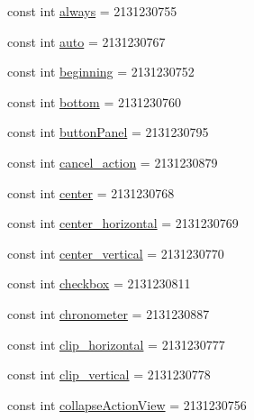 \begin{DoxyCompactItemize}
const int \mbox{\hyperlink{class_f_w_p_s___app_1_1_droid_1_1_resource_1_1_id_a29f3c29a08621a6d1b99e1af41df2c50}{always}} = 2131230755
\item 
const int \mbox{\hyperlink{class_f_w_p_s___app_1_1_droid_1_1_resource_1_1_id_afa5149667d34859ac0b674d23b6a4b42}{auto}} = 2131230767
\item 
const int \mbox{\hyperlink{class_f_w_p_s___app_1_1_droid_1_1_resource_1_1_id_af2a36e42b6848ba0f5e3dc34737400c0}{beginning}} = 2131230752
\item 
const int \mbox{\hyperlink{class_f_w_p_s___app_1_1_droid_1_1_resource_1_1_id_ac53080974016f8a3835da246a13082bf}{bottom}} = 2131230760
\item 
const int \mbox{\hyperlink{class_f_w_p_s___app_1_1_droid_1_1_resource_1_1_id_a85cd3b055d0c573fd415f6b214b64ece}{button\+Panel}} = 2131230795
\item 
const int \mbox{\hyperlink{class_f_w_p_s___app_1_1_droid_1_1_resource_1_1_id_a7eb823e9f122f33fdab97caff07fc582}{cancel\+\_\+action}} = 2131230879
\item 
const int \mbox{\hyperlink{class_f_w_p_s___app_1_1_droid_1_1_resource_1_1_id_aaf9cd2fe67ad08c125ee8c3cbc5a6b6e}{center}} = 2131230768
\item 
const int \mbox{\hyperlink{class_f_w_p_s___app_1_1_droid_1_1_resource_1_1_id_ad3311bea79e59d4c516152dfc2dbf69a}{center\+\_\+horizontal}} = 2131230769
\item 
const int \mbox{\hyperlink{class_f_w_p_s___app_1_1_droid_1_1_resource_1_1_id_afd8c138a3275e3042e3a9345886d9435}{center\+\_\+vertical}} = 2131230770
\item 
const int \mbox{\hyperlink{class_f_w_p_s___app_1_1_droid_1_1_resource_1_1_id_a2f25004902cfe6883a1cf2e8206ae831}{checkbox}} = 2131230811
\item 
const int \mbox{\hyperlink{class_f_w_p_s___app_1_1_droid_1_1_resource_1_1_id_a26e6fc6e09fbfb4c8dbdeef2c6e54d70}{chronometer}} = 2131230887
\item 
const int \mbox{\hyperlink{class_f_w_p_s___app_1_1_droid_1_1_resource_1_1_id_a84c2697d7811edc69dcad3144a96dcde}{clip\+\_\+horizontal}} = 2131230777
\item 
const int \mbox{\hyperlink{class_f_w_p_s___app_1_1_droid_1_1_resource_1_1_id_ad7cd7da315f5ae850ddf9382cee6886a}{clip\+\_\+vertical}} = 2131230778
\item 
const int \mbox{\hyperlink{class_f_w_p_s___app_1_1_droid_1_1_resource_1_1_id_af2d3880ead5ca47ea84947c9e093eedf}{collapse\+Action\+View}} = 2131230756
\item 

\end{DoxyCompactItemize}
